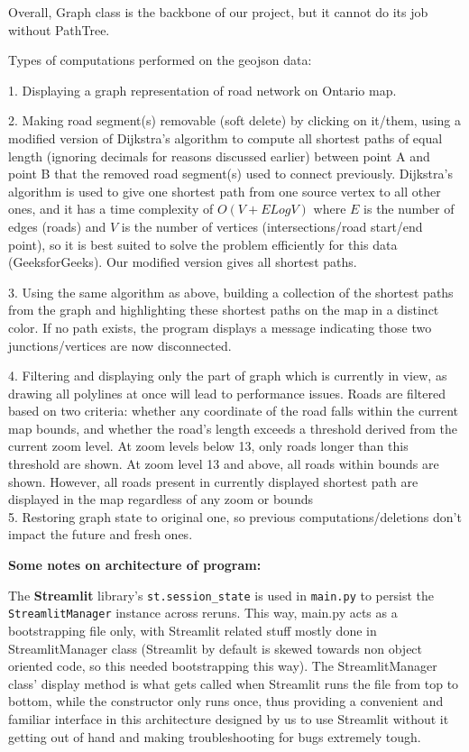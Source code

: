 \documentclass[fontsize=11pt]{article}
\begin{document}
Overall, Graph class is the backbone of our project, but it cannot do its job without PathTree.


Types of computations performed on the geojson data:

1. Displaying a graph representation of road network on Ontario map.

2. Making road segment(s) removable (soft delete) by clicking on it/them, using a modified version of Dijkstra's algorithm to compute all shortest paths of equal length (ignoring decimals for reasons discussed earlier) between point A and point B that the removed road segment(s) used to connect previously. Dijkstra's algorithm is used to give one shortest path from one
source vertex to all other ones, and it has a time complexity of $O(V+ELogV)$ where $E$ is the number of edges (roads) and $V$ is the number of vertices (intersections/road start/end point), so it is best suited to solve the problem efficiently for this data (GeeksforGeeks). Our modified version gives all shortest paths.

3. Using the same algorithm as above, building a collection of the shortest paths from the graph and highlighting these shortest paths on the map in a distinct color. If no path exists, the program displays a message indicating those two junctions/vertices are now disconnected.

4. Filtering and displaying only the part of graph which is currently in view, as drawing all polylines at once will lead to performance issues. Roads are filtered based on two criteria: whether any coordinate of the road falls within the current map bounds, and whether the road's length exceeds a threshold derived from the current zoom level. At zoom levels below 13, only roads longer than this threshold are shown. At zoom level 13 and above, all roads within bounds are shown. However, all roads present in currently displayed shortest path are displayed in the map regardless of any zoom or bounds\\

5. Restoring graph state to original one, so previous computations/deletions don't impact the future and fresh ones.

\textbf{Some notes on architecture of program:}

The \textbf{Streamlit} library's \texttt{st.session\_state} is used in \texttt{main.py} to persist the \texttt{StreamlitManager} instance across reruns. This way, main.py acts as a bootstrapping file only, with Streamlit related stuff mostly done in StreamlitManager class (Streamlit by default is skewed towards non object oriented code, so this needed bootstrapping this way). The StreamlitManager class' display method is what gets called when Streamlit runs the file from top to bottom, while the constructor only runs once, thus providing a convenient and familiar interface in this architecture designed by us to use Streamlit without it getting out of hand and making troubleshooting for bugs extremely tough.
\end{document}
